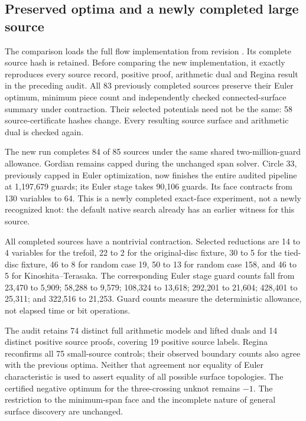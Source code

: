 \subsection{Preserved optima and a newly completed large source}

The comparison loads the full flow implementation from revision
. Its complete source hash is retained. Before comparing the
new implementation, it exactly reproduces every source record, positive proof,
arithmetic dual and Regina result in the preceding audit. All 83 previously
completed sources preserve their Euler optimum, minimum piece count and
independently checked connected-surface summary under contraction. Their
selected potentials need not be the same: 58 source-certificate hashes change.
Every resulting source surface and arithmetic dual is checked again.

The new run completes 84 of 85 sources under the same shared two-million-guard
allowance. Gordian remains capped during the unchanged span solver. Circle 33,
previously capped in Euler optimization, now finishes the entire audited
pipeline at 1,197,679 guards; its Euler stage takes 90,106 guards. Its face
contracts from 130 variables to 64. This is a newly completed exact-face
experiment, not a newly recognized knot: the default native search already
has an earlier witness for this source.

All completed sources have a nontrivial contraction. Selected reductions are
14 to 4 variables for the trefoil, 22 to 2 for the original-disc fixture,
30 to 5 for the tied-disc fixture, 46 to 8 for random case 19, 50 to 13 for
random case 158, and 46 to 5 for Kinoshita--Terasaka. The corresponding Euler
stage guard counts fall from 23,470 to 5,909; 58,288 to 9,579; 108,324 to 13,618;
292,201 to 21,604; 428,401 to 25,311; and 322,516 to 21,253. Guard counts measure
the deterministic allowance, not elapsed time or bit operations.

The audit retains 74 distinct full arithmetic models and lifted duals and 14
distinct positive source proofs, covering 19 positive source labels. Regina
reconfirms all 75 small-source controls; their observed boundary counts also
agree with the previous optima. Neither that agreement nor equality of Euler
characteristic is used to assert equality of all possible surface topologies.
The certified negative optimum for the three-crossing unknot remains $-1$.
The restriction to the minimum-span face and the incomplete nature of general
surface discovery are unchanged.

